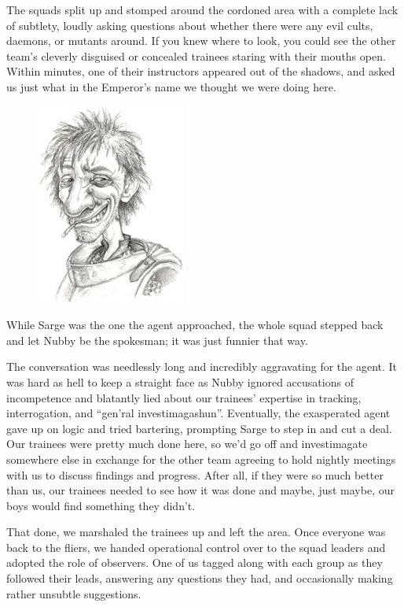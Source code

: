 The squads split up and stomped around the cordoned area with a complete lack of subtlety, loudly asking questions about whether there were any evil cults, daemons, or mutants around. 
If you knew where to look, you could see the other team’s cleverly disguised or concealed trainees staring with their mouths open. 
Within minutes, one of their instructors appeared out of the shadows, and asked us just what in the Emperor’s name we thought we were doing here.

\begin{figure}
	\begin{center}
		\includegraphics[width=\figwidth]{pics/8/28.png}
	\end{center}
\end{figure}
While Sarge was the one the agent approached, the whole squad stepped back and let Nubby be the spokesman; 
it was just funnier that way.

The conversation was needlessly long and incredibly aggravating for the agent. 
It was hard as hell to keep a straight face as Nubby ignored accusations of incompetence and blatantly lied about our trainees’ expertise in tracking, interrogation, and “gen’ral investimagashun”. 
Eventually, the exasperated agent gave up on logic and tried bartering, prompting Sarge to step in and cut a deal. 
Our trainees were pretty much done here, so we’d go off and investimagate somewhere else in exchange for the other team agreeing to hold nightly meetings with us to discuss findings and progress. 
After all, if they were so much better than us, our trainees needed to see how it was done and maybe, just maybe, our boys would find something they didn’t.

That done, we marshaled the trainees up and left the area. 
Once everyone was back to the fliers, we handed operational control over to the squad leaders and adopted the role of observers. 
One of us tagged along with each group as they followed their leads, answering any questions they had, and occasionally making rather unsubtle suggestions.

